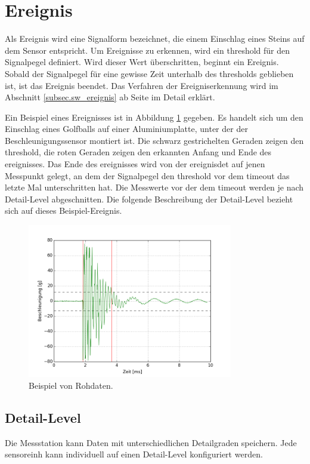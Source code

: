 \section{Ereignis}\label{sec.manualimpact}
Als Ereignis wird eine Signalform bezeichnet, die einem Einschlag eines Steins auf dem Sensor entspricht. Um Ereignisse zu erkennen, wird ein \gls{threshold} für den Signalpegel definiert. Wird dieser Wert überschritten, beginnt ein Ereignis. Sobald der Signalpegel für eine gewisse Zeit unterhalb des \gls{threshold}s geblieben ist, ist das Ereignis beendet. Das Verfahren der Ereigniserkennung wird im Abschnitt \ref{subsec.sw_ereignis} ab Seite \pageref{subsec.sw_ereignis} im Detail erklärt.

Ein Beispiel eines Ereignisses ist in Abbildung \ref{fig.impactraw} gegeben. Es handelt sich um den Einschlag eines Golfballs auf einer Aluminiumplatte, unter der der Beschleunigungssensor montiert ist. Die schwarz gestrichelten Geraden zeigen den \gls{threshold}, die roten Geraden zeigen den erkannten Anfang und Ende des \gls{ereignis}ses. Das Ende des \gls{ereignis}ses wird von der \gls{ereignisdet} auf jenen Messpunkt gelegt, an dem der Signalpegel den \gls{threshold} vor dem \gls{timeout} das letzte Mal unterschritten hat. Die Messwerte vor der dem \gls{timeout} werden je nach Detail-Level abgeschnitten. Die folgende Beschreibung der Detail-Level bezieht sich auf dieses Beispiel-Ereignis.

\begin{figure}
	\centering
		\includegraphics[width=0.8\textwidth]{images/raw.png}
	\caption{Beispiel von Rohdaten.}
	\label{fig.impactraw}
\end{figure}

\subsection{Detail-Level}
Die Messstation kann Daten mit unterschiedlichen Detailgraden speichern. Jede \gls{sensoreinh} kann individuell auf einen Detail-Level konfiguriert werden.

